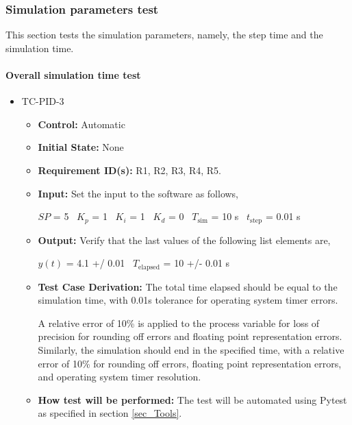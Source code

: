 \documentclass[12pt, titlepage]{article}
\begin{document}
\subsubsection{Simulation parameters test}
This section tests the simulation parameters, namely, the step time and the simulation time.

\paragraph{Overall simulation time test}

\begin{itemize}
\item{TC-PID-3\\}
\begin{itemize}

\item{\textbf{Control:}} Automatic
					
\item{\textbf{Initial State:}} None

\item{\textbf{Requirement ID(s):}}  R1, R2, R3, R4, R5.
					
\item{\textbf{Input:}} Set the input to the software as follows,

$SP$ = 5
~\newline$K_p$ = 1
~\newline$K_i$ = 1
~\newline$K_d$ = 0
~\newline$T_\text{sim}$ = 10 s
~\newline$t_\text{step}$ = 0.01 s
					
\item{\textbf{Output:}}  Verify that the last values of the following list elements are,

$y(t)$ =  4.1 +/ 0.01
~\newline$T_\text{elapsed}$  = 10 +/- 0.01 s

\item{\textbf{Test Case Derivation:}}  The total time elapsed should be equal to the simulation time, 
with 0.01s tolerance for operating system timer errors.

A relative error of 10\% is applied to the process variable for loss
of precision for rounding off errors and floating point representation
errors. Similarly, the simulation should end in the specified time, with a 
relative error of 10\% for rounding off errors, floating point 
representation errors, and operating system timer resolution.


\item{\textbf{How test will be performed:}}  The test will be automated using Pytest as specified in 
section \ref{sec_Tools}.

\end{itemize}
\end{itemize}
\end{document}

